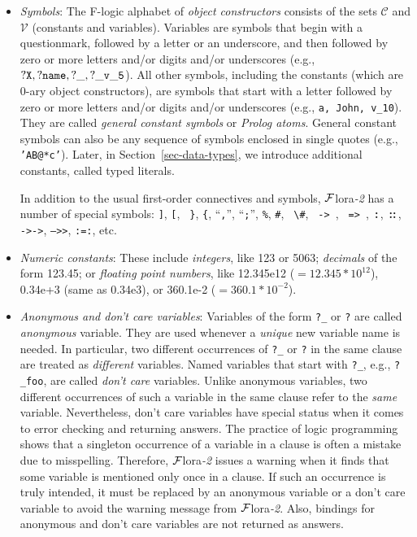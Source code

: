 \documentclass[11pt]{article}
\newcommand{\FLORA}{{\mbox{\sc ${\cal F}${lora}\rm\emph{-2}}}\xspace}
\newcommand{\FLSYSTEM}{\FLORA}
\newcommand{\isa}{\,{\bf{:}}\,}
\newcommand{\subcl}{\,{\bf{::}}\,}
\newcommand{\mvd}{{\mbox{\tt \,->\,}}}  %
\newcommand{\Mvd}{{\mbox{\tt \,=>\,}}}  %
\newcommand{\bs}{\textbackslash}
\newcommand{\fl}{\mbox{F-logic}\xspace}
\newcommand{\consts}{\ensuremath{\mathcal{C}}\xspace}
\newcommand{\vars}{\ensuremath{\mathcal{V}}\xspace}
\begin{document}
\begin{itemize}
\item \emph{Symbols}: The \fl alphabet of \emph{object constructors}
  consists of the sets \consts
  and \vars
  (constants and variables).  Variables are symbols that begin with a questionmark,
  followed by a letter or an underscore, and then followed by zero or more letters and/or digits and/or
  underscores (e.g., $\tt ?X, ?name, ?\_, ?\_v\_5$).  All other symbols,
  including the constants (which are 0-ary object constructors), are
  symbols that start with a letter followed by zero or more letters and/or digits and/or
  underscores (e.g., {\tt a, John, v\_10}). They are called
  \emph{general constant symbols} or \emph{Prolog atoms}.  
  General constant symbols can also be any sequence of symbols enclosed in single quotes
  (e.g., {\tt 'AB@*c'}).
  Later, in Section~\ref{sec-data-types}, we introduce additional constants,
  called typed literals.
  
  In addition to the usual first-order connectives
  and symbols, \FLSYSTEM has a number of special symbols: {\tt ]}, {\tt [}, {\tt
    \}}, {\tt \{}, ``{\tt ,}'', ``{\tt ;}'', {\tt \%}, {\tt \#}, {\tt
    \bs{}\#}, \mvd,
  \Mvd, \isa, \subcl, {\tt ->->}, \texttt{-->>},  {\tt :=:}, etc.

\item \emph{Numeric constants}: These include \emph{integers}, like 123 or
  5063; \emph{decimals} of the form 123.45; or \emph{floating point
    numbers}, like 12.345e12 ($= 12.345*10^{12}$), 0.34e+3 (same as
  0.34e3), or 360.1e-2 ($= 360.1*10^{-2}$).
  
\item \emph{Anonymous and don't care variables}: Variables  of the form
  {\tt ?\_} or {\tt ?} are called \emph{anonymous}
  variable. They are used whenever a \emph{unique} new variable name
  is needed.  In
  particular, two different occurrences of {\tt ?\_} or {\tt ?} in the same clause are
  treated as \emph{different} variables. Named variables that start with
  \texttt{?\_}, e.g., {\tt ?\_foo}, are called \emph{don't care} variables.
  Unlike anonymous variables, two different occurrences of such a variable
  in the same clause refer to the \emph{same} variable. Nevertheless, don't
  care variables have special status when it comes to error checking
  and returning answers.  The practice of logic programming shows that a
  singleton occurrence of a variable in a clause is often a mistake due to
  misspelling. Therefore, \FLSYSTEM issues a warning when it finds that some
  variable is mentioned only once in a clause. If such an occurrence is
  truly intended, it must be replaced by an anonymous variable or a don't
  care variable to avoid the warning message from \FLSYSTEM. Also, bindings
  for anonymous and don't care variables are not returned as answers.


\end{itemize}
\end{document}
